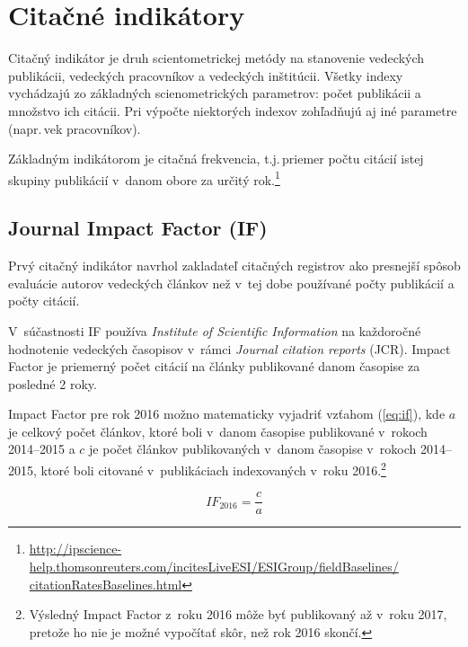 
\section{Citačné indikátory}
\label{sec:citation.indicators}

Citačný indikátor je druh scientometrickej metódy na stanovenie 
vedeckých publikácii, vedeckých pracovníkov a vedeckých inštitúcii.  Všetky
indexy vychádzajú zo základných scienometrických parametrov: počet publikácii a
množstvo ich citácii.  Pri výpočte niektorých indexov zohľadňujú aj iné
parametre (napr.\,vek pracovníkov).

Základným indikátorom je citačná frekvencia, t.j.\,priemer počtu citácií istej
skupiny publikácií v~danom obore za určitý
rok.\footnote{\url{http://ipscience-help.thomsonreuters.com/incitesLiveESI/ESIGroup/fieldBaselines/
    citationRatesBaselines.html}}


\subsection{Journal Impact Factor (IF)}

Prvý citačný indikátor navrhol zakladateľ citačných registrov
\citet{Garfield1955} ako presnejší spôsob evaluácie autorov vedeckých článkov
než v~tej dobe používané počty publikácií a počty citácií.

V~súčastnosti IF používa \emph{Institute of Scientific Information} na
každoročné hodnotenie vedeckých časopisov v~rámci \emph{Journal citation
  reports} (JCR).  Impact Factor je priemerný počet citácií na články
publikované danom časopise za posledné 2 roky.

Impact Factor pre rok 2016 možno matematicky vyjadriť vzťahom (\ref{eq:if}), kde
$a$ je celkový počet článkov, ktoré boli v~danom časopise publikované v~rokoch
2014--2015 a $c$ je počet článkov publikovaných v~danom časopise v~rokoch
2014--2015, ktoré boli citované v~publikáciach indexovaných v~roku
2016.\footnote{Výsledný Impact Factor z~roku 2016 môže byť publikovaný až v~roku
  2017, pretože ho nie je možné vypočítať skôr, než rok 2016 skončí.}

\begin{equation}
\label{eq:if}
\mathit{IF}_{2016} = \frac{c}{a}
\end{equation}

